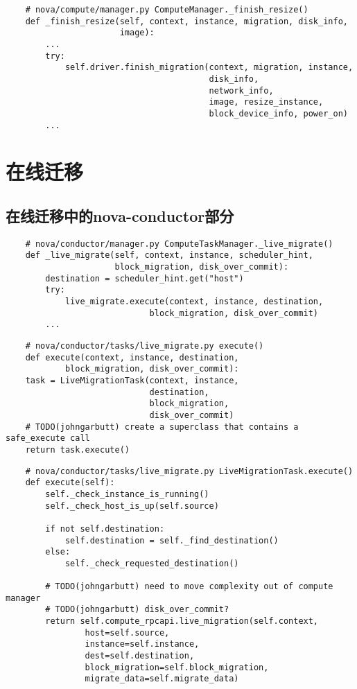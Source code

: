 \documentclass[a4paper,left=1.5cm,right=1.5cm,11pt]{article}
\begin{document}
	\begin{lstlisting}
	# nova/compute/manager.py ComputeManager._finish_resize()
	def _finish_resize(self, context, instance, migration, disk_info,
                       image):
        ...
        try:
            self.driver.finish_migration(context, migration, instance,
                                         disk_info,
                                         network_info,
                                         image, resize_instance,
                                         block_device_info, power_on)
        ...
	\end{lstlisting}

\section{在线迁移}
\subsection{在线迁移中的nova-conductor部分}
    \begin{lstlisting}
    # nova/conductor/manager.py ComputeTaskManager._live_migrate()
    def _live_migrate(self, context, instance, scheduler_hint,
                      block_migration, disk_over_commit):
        destination = scheduler_hint.get("host")
        try:
            live_migrate.execute(context, instance, destination,
                             block_migration, disk_over_commit)
        ...
    \end{lstlisting}

    \begin{lstlisting}
    # nova/conductor/tasks/live_migrate.py execute()
    def execute(context, instance, destination,
            block_migration, disk_over_commit):
    task = LiveMigrationTask(context, instance,
                             destination,
                             block_migration,
                             disk_over_commit)
    # TODO(johngarbutt) create a superclass that contains a safe_execute call
    return task.execute()
    \end{lstlisting}

    \begin{lstlisting}
    # nova/conductor/tasks/live_migrate.py LiveMigrationTask.execute()
    def execute(self):
        self._check_instance_is_running()
        self._check_host_is_up(self.source)

        if not self.destination:
            self.destination = self._find_destination()
        else:
            self._check_requested_destination()

        # TODO(johngarbutt) need to move complexity out of compute manager
        # TODO(johngarbutt) disk_over_commit?
        return self.compute_rpcapi.live_migration(self.context,
                host=self.source,
                instance=self.instance,
                dest=self.destination,
                block_migration=self.block_migration,
                migrate_data=self.migrate_data)
    \end{lstlisting}
\end{document}
